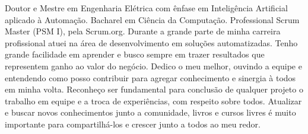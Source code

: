 

\begin{cvparagraph}

Doutor e Mestre em Engenharia Elétrica com ênfase em Inteligência Artificial aplicado à Automação. Bacharel em Ciência da Computação. Professional Scrum Master (PSM I), pela Scrum.org. Durante a grande parte de minha carreira profissional atuei na área de desenvolvimento em soluções automatizadas. Tenho grande facilidade em aprender e busco sempre em trazer resultados que representem ganho ao valor do negócio. Dedico o meu melhor, ouvindo a equipe e entendendo como posso contribuir para agregar conhecimento e sinergia à todos em minha volta. Reconheço ser fundamental para conclusão de qualquer projeto o trabalho em equipe e a troca de experiências, com respeito sobre todos. Atualizar e buscar novos conhecimentos junto a comunidade, livros e cursos livres é muito importante para compartilhá-los e crescer junto a todos ao meu redor.
\end{cvparagraph}
